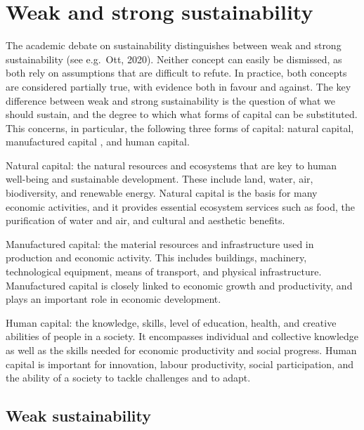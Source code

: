 \documentclass[
  a4paper,
  openany]{book}
\begin{document}
\section{Weak and strong
sustainability}\label{weak-and-strong-sustainability}

The academic debate on sustainability distinguishes between weak and
strong sustainability (see e.g.~Ott, 2020). Neither concept can easily
be dismissed, as both rely on assumptions that are difficult to refute.
In practice, both concepts are considered partially true, with evidence
both in favour and against. The key difference between weak and strong
sustainability is the question of what we should sustain, and the degree
to which what forms of capital can be substituted. This concerns, in
particular, the following three forms of capital: natural capital,
manufactured capital , and human capital.

Natural capital: the natural resources and ecosystems that are key to
human well-being and sustainable development. These include land, water,
air, biodiversity, and renewable energy. Natural capital is the basis
for many economic activities, and it provides essential ecosystem
services such as food, the purification of water and air, and cultural
and aesthetic benefits.

Manufactured capital: the material resources and infrastructure used in
production and economic activity. This includes buildings, machinery,
technological equipment, means of transport, and physical
infrastructure. Manufactured capital is closely linked to economic
growth and productivity, and plays an important role in economic
development.

Human capital: the knowledge, skills, level of education, health, and
creative abilities of people in a society. It encompasses individual and
collective knowledge as well as the skills needed for economic
productivity and social progress. Human capital is important for
innovation, labour productivity, social participation, and the ability
of a society to tackle challenges and to adapt.

\subsection{Weak sustainability}\label{weak-sustainability}
\end{document}
